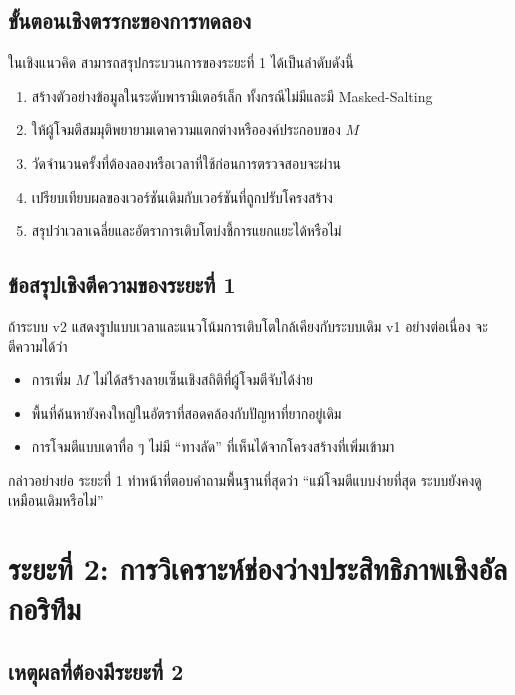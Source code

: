\documentclass[12pt,a4paper]{article}
\newcommand{\eng}[1]{\textenglish{#1}}
\begin{document}
	\subsection{ขั้นตอนเชิงตรรกะของการทดลอง}
	
	ในเชิงแนวคิด สามารถสรุปกระบวนการของระยะที่ 1 ได้เป็นลำดับดังนี้
	\begin{enumerate}[label=\arabic*.]
		\item สร้างตัวอย่างข้อมูลในระดับพารามิเตอร์เล็ก ทั้งกรณีไม่มีและมี \eng{Masked-Salting}
		\item ให้ผู้โจมตีสมมุติพยายามเดาความแตกต่างหรือองค์ประกอบของ $M$
		\item วัดจำนวนครั้งที่ต้องลองหรือเวลาที่ใช้ก่อนการตรวจสอบจะผ่าน
		\item เปรียบเทียบผลของเวอร์ชันเดิมกับเวอร์ชันที่ถูกปรับโครงสร้าง
		\item สรุปว่าเวลาเฉลี่ยและอัตราการเติบโตบ่งชี้การแยกแยะได้หรือไม่
	\end{enumerate}
	
	\subsection{ข้อสรุปเชิงตีความของระยะที่ 1}
	
	ถ้าระบบ \eng{v2} แสดงรูปแบบเวลาและแนวโน้มการเติบโตใกล้เคียงกับระบบเดิม \eng{v1} อย่างต่อเนื่อง จะตีความได้ว่า
	\begin{itemize}
		\item การเพิ่ม $M$ ไม่ได้สร้างลายเซ็นเชิงสถิติที่ผู้โจมตีจับได้ง่าย
		\item พื้นที่ค้นหายังคงใหญ่ในอัตราที่สอดคล้องกับปัญหาที่ยากอยู่เดิม
		\item การโจมตีแบบเดาทื่อ ๆ ไม่มี ``ทางลัด'' ที่เห็นได้จากโครงสร้างที่เพิ่มเข้ามา
	\end{itemize}
	
	กล่าวอย่างย่อ ระยะที่ 1 ทำหน้าที่ตอบคำถามพื้นฐานที่สุดว่า ``แม้โจมตีแบบง่ายที่สุด ระบบยังคงดูเหมือนเดิมหรือไม่''
	
	\section{ระยะที่ 2: การวิเคราะห์ช่องว่างประสิทธิภาพเชิงอัลกอริทึม}
	
	\subsection{เหตุผลที่ต้องมีระยะที่ 2}
	
\end{document}
